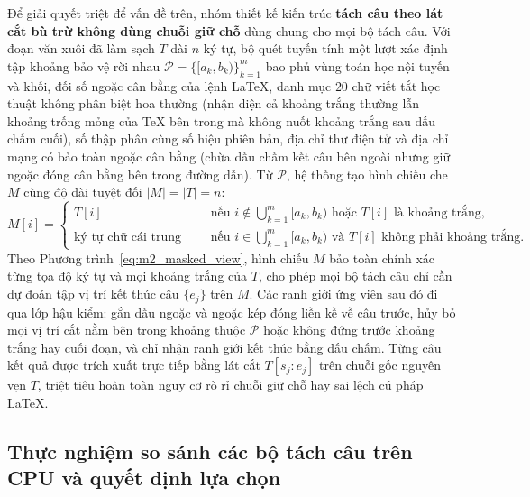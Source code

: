 Để giải quyết triệt để vấn đề trên, nhóm thiết kế kiến trúc \textbf{tách câu theo lát cắt bù trừ không dùng chuỗi giữ chỗ} dùng chung cho mọi bộ tách câu. Với đoạn văn xuôi đã làm sạch $T$ dài $n$ ký tự, bộ quét tuyến tính một lượt xác định tập khoảng bảo vệ rời nhau $\mathcal{P} = \{[a_k, b_k)\}_{k=1}^{m}$ bao phủ vùng toán học nội tuyến và khối, đối số ngoặc cân bằng của lệnh LaTeX, danh mục $20$ chữ viết tắt học thuật không phân biệt hoa thường (nhận diện cả khoảng trắng thường lẫn khoảng trống mỏng của TeX bên trong mà không nuốt khoảng trắng sau dấu chấm cuối), số thập phân cùng số hiệu phiên bản, địa chỉ thư điện tử và địa chỉ mạng có bảo toàn ngoặc cân bằng (chừa dấu chấm kết câu bên ngoài nhưng giữ ngoặc đóng cân bằng bên trong đường dẫn). Từ $\mathcal{P}$, hệ thống tạo hình chiếu che $M$ cùng độ dài tuyệt đối $|M| = |T| = n$:
\begin{equation}
    M[i] =
    \begin{cases}
        T[i] & \text{nếu } i \notin \bigcup_{k=1}^{m} [a_k, b_k) \text{ hoặc } T[i] \text{ là khoảng trắng}, \\
        \text{ký tự chữ cái trung tính} & \text{nếu } i \in \bigcup_{k=1}^{m} [a_k, b_k) \text{ và } T[i] \text{ không phải khoảng trắng}.
    \end{cases}
    \label{eq:m2_masked_view}
\end{equation}
Theo Phương trình~\eqref{eq:m2_masked_view}, hình chiếu $M$ bảo toàn chính xác từng tọa độ ký tự và mọi khoảng trắng của $T$, cho phép mọi bộ tách câu chỉ cần dự đoán tập vị trí kết thúc câu $\{e_j\}$ trên $M$. Các ranh giới ứng viên sau đó đi qua lớp hậu kiểm: gắn dấu ngoặc và ngoặc kép đóng liền kề về câu trước, hủy bỏ mọi vị trí cắt nằm bên trong khoảng thuộc $\mathcal{P}$ hoặc không đứng trước khoảng trắng hay cuối đoạn, và chỉ nhận ranh giới kết thúc bằng dấu chấm. Từng câu kết quả được trích xuất trực tiếp bằng lát cắt $T[s_j : e_j]$ trên chuỗi gốc nguyên vẹn $T$, triệt tiêu hoàn toàn nguy cơ rò rỉ chuỗi giữ chỗ hay sai lệch cú pháp LaTeX.

\subsection{Thực nghiệm so sánh các bộ tách câu trên CPU và quyết định lựa chọn}

